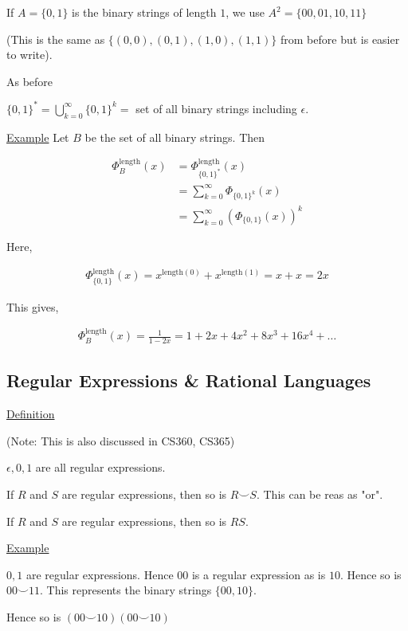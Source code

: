 \documentclass{article}
\begin{document}
If $A = \{0,1\}$ is the binary strings of length $1$, we use $A^2 = \{00,01,10,11\}$

(This is the same as $\{(0,0),(0,1),(1,0),(1,1)\}$ from before but is easier to write). 

As before

$\{0,1\}^* = \bigcup_{k=0}^{\infty}\{0,1\}^k = $ set of all binary strings including $\epsilon$.


\underline{Example} Let $B$ be the set of all binary strings. Then

\begin{align*}
    \Phi_{B}^{\text{length}}(x) &= \Phi_{\{0,1\}^*}^{\text{length}}(x) \\
    &= \sum_{k=0}^{\infty}\Phi_{\{0,1\}^k}(x) \\
    &= \sum_{k=0}^{\infty}(\Phi_{\{0,1\}}(x))^k
\end{align*}

Here, 

\begin{align*}
    \Phi_{\{0,1\}}^{\text{length}}(x) = x^{\text{length}(0)} + x^{\text{length}(1)} = x + x = 2x
\end{align*}

This gives,

\begin{align*}
    \Phi_{B}^{\text{length}}(x) = \frac{1}{1-2x} = 1 + 2x + 4x^2 + 8x^3 + 16x^4 + \ldots
\end{align*}

\subsection{Regular Expressions \& Rational Languages}

\underline{Definition}

(Note: This is also discussed in CS360, CS365)

$\epsilon,0,1$ are all regular expressions.

If $R$ and $S$ are regular expressions, then so is $R \smile S$. This can be reas as "or".

If $R$ and $S$ are regular expressions, then so is $RS$.

\underline{Example}

$0,1$ are regular expressions. Hence $00$ is a regular expression as is $10$. Hence so is $00 \smile 11$. This represents the binary strings $\{00,10\}$.

Hence so is $(00 \smile 10)(00 \smile 10)$
\end{document}
